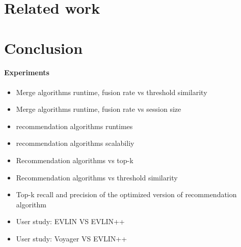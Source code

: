 \section{Related work}
\label{sec:related}


\section{Conclusion}
\label{sec:conclusion}

		
		\paragraph*{Experiments}
\begin{itemize}
\item Merge algorithms runtime, fusion rate  vs threshold similarity
\item Merge algorithms runtime, fusion rate  vs session size
\item recommendation algorithms runtimes
\item recommendation algorithms scalabiliy
\item  {\color{red}Recommendation algorithms vs top-k}
\item  {\color{red}Recommendation algorithms vs  threshold similarity}
\item  {\color{red}Top-k recall and precision of the optimized version of recommendation algorithm}
\item User study: EVLIN VS EVLIN++ 
\item User study: Voyager VS EVLIN++ 
\end{itemize}